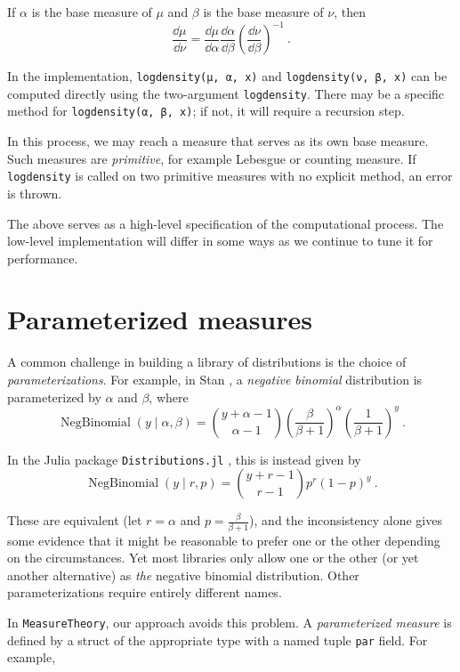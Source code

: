 \documentclass{juliacon}
\begin{document}
If $\alpha$ is the base measure of $\mu$ and $\beta$ is the base measure of $\nu$, then
\[
\frac{\dd \mu}{\dd \nu} =
\frac{\dd \mu}{\dd \alpha}
\frac{\dd \alpha}{\dd \beta}
\left(\frac{\dd \nu}{\dd \beta}\right)^{-1}\ .
\]

In the implementation, \verb|logdensity(μ, α, x)| and \verb|logdensity(ν, β, x)| can be computed directly using the two-argument \verb|logdensity|. There may be a specific method for \verb|logdensity(α, β, x)|; if not, it will require a recursion step.

In this process, we may reach a measure that serves as its own base measure. Such measures are \emph{primitive}, for example Lebesgue or counting measure. If \verb|logdensity| is called on two primitive measures with no explicit method, an error is thrown.

The above serves as a high-level specification  of the computational process. The low-level implementation will differ in some ways as we continue to tune it for performance.


\section{Parameterized measures}

A common challenge in building a library of distributions is the choice of \emph{parameterizations}. For example, in Stan \cite{Stan},
a \emph{negative binomial} distribution is parameterized by $\alpha$ and $\beta$, where
\[
\operatorname{NegBinomial}(y \mid \alpha, \beta)
=\binom{y+\alpha-1}{\alpha-1}\left(\frac{\beta}{\beta+1}\right)^{\alpha}\left(\frac{1}{\beta+1}\right)^{y}\ .
\]

In the Julia package \verb|Distributions.jl| \cite{Distributions.jl-2019}, this is instead given by
\[
\operatorname{NegBinomial}(y \mid r, p)
= \binom{y + r - 1}{r - 1} p^r (1 - p)^y \ .
\]

These are equivalent (let $r = \alpha$ and $p = \frac{\beta}{\beta + 1}$), and the inconsistency alone gives some evidence that it might be reasonable to prefer one or the other depending on the circumstances. Yet most libraries only allow one or the other (or yet another alternative) as \emph{the} negative binomial distribution. Other parameterizations require entirely different names.

In \verb|MeasureTheory|, our approach avoids this problem. A \emph{parameterized measure} is defined by a struct of the appropriate type with a named tuple \verb|par| field. For example,
\end{document}
